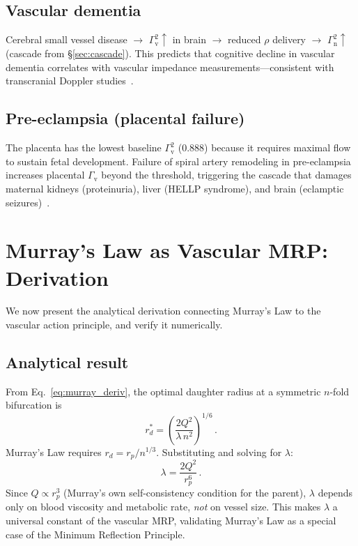 ﻿\documentclass[aps,pre,twocolumn,superscriptaddress,floatfix]{revtex4-2}
\newcommand{\Gv}{\Gamma_{\mathrm{v}}}
\newcommand{\Gn}{\Gamma_{\mathrm{n}}}
\begin{document}
\subsection{Vascular dementia}

Cerebral small vessel disease $\to$ $\Gv^2 \uparrow$ in brain
$\to$ reduced $\rho$ delivery $\to$ $\Gn^2 \uparrow$
(cascade from \S\ref{sec:cascade}).
This predicts that cognitive decline in vascular dementia
correlates with vascular impedance measurements---consistent
with transcranial Doppler studies~\cite{mok2012}.

\subsection{Pre-eclampsia (placental failure)}

The placenta has the lowest baseline $\Gv^2$ (0.888) because
it requires maximal flow to sustain fetal development.
Failure of spiral artery remodeling in pre-eclampsia
increases placental $\Gv$ beyond the threshold,
triggering the cascade that damages maternal kidneys
(proteinuria), liver (HELLP syndrome), and brain
(eclamptic seizures)~\cite{steegers2010}.


\section{Murray's Law as Vascular MRP: Derivation}
\label{sec:murray_deriv}

We now present the analytical derivation connecting
Murray's Law to the vascular action principle,
and verify it numerically.

\subsection{Analytical result}

From Eq.~\eqref{eq:murray_deriv}, the optimal daughter
radius at a symmetric $n$-fold bifurcation is
\begin{equation}
  r_d^* = \left(\frac{2Q^2}{\lambda\,n^2}\right)^{1/6}\,.
\end{equation}
Murray's Law requires $r_d = r_p / n^{1/3}$.
Substituting and solving for $\lambda$:
\begin{equation}
  \lambda = \frac{2Q^2}{r_p^6}\,.
\end{equation}
Since $Q \propto r_p^3$ (Murray's own self-consistency
condition for the parent), $\lambda$ depends only on
blood viscosity and metabolic rate, \emph{not} on
vessel size.
This makes $\lambda$ a universal constant of the
vascular MRP, validating Murray's Law as a
special case of the Minimum Reflection Principle.
\end{document}
